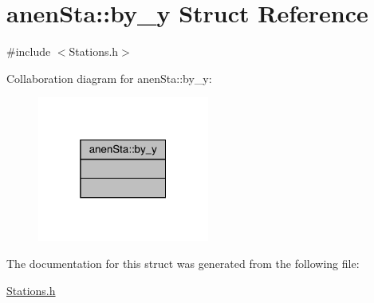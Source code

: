 \hypertarget{structanen_sta_1_1by__y}{}\section{anen\+Sta\+:\+:by\+\_\+y Struct Reference}
\label{structanen_sta_1_1by__y}


{\ttfamily \#include $<$Stations.\+h$>$}



Collaboration diagram for anen\+Sta\+:\+:by\+\_\+y\+:\nopagebreak
\begin{figure}[H]
\begin{center}
\leavevmode
\includegraphics[width=160pt]{structanen_sta_1_1by__y__coll__graph}
\end{center}
\end{figure}


The documentation for this struct was generated from the following file\+:\begin{DoxyCompactItemize}
\item 
\mbox{\hyperlink{_stations_8h}{Stations.\+h}}\end{DoxyCompactItemize}
